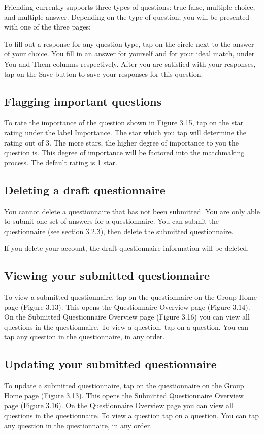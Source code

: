 \documentclass[a4paper,11pt,titlepage]{scrartcl}
\newcommand{\textapp}[1]{{\fontfamily{cmss}\selectfont#1}}
\newcommand{\Friending}{\textapp{Friending}}
\begin{document}
\Friending{} currently supports three types of questions: true-false, multiple choice, and multiple answer.  Depending on the type of question, you will be presented with one of the three pages:

To fill out a response for any question type, tap on the circle next to the answer of your choice.
You fill in an answer for yourself and for your ideal match, under You and Them columns respectively.  After you are satisfied with your responses, tap on the Save button to save your responses for this question.

\subsection{Flagging important questions}
\label{sec:questionnaire-importance}
To rate the importance of the question shown in Figure 3.15, tap on the star rating  under the label Importance.  The star which you tap will determine the rating out of 3.  The more stars, the higher degree of  importance to you the question is.  This degree of importance will be factored into the matchmaking process.  The default rating is 1 star. 

\subsection{Deleting a draft questionnaire}
\label{sec:questionnaire-delete}
You cannot delete a questionnaire that has not been submitted.   You are only able to submit one set of answers for a questionnaire.  You can submit the questionnaire (see section 3.2.3), then delete the submitted questionnaire.

If you delete your account, the draft questionnaire information will be deleted.

\subsection{Viewing your submitted questionnaire}
\label{sec:questionnaire-submitted-view}
To view a submitted questionnaire, tap on the questionnaire on the Group Home page (Figure 3.13). This opens the Questionnaire Overview page (Figure 3.14).   On the Submitted Questionnaire Overview page (Figure 3.16) you can view all questions in the questionnaire.  To view a question, tap on a question.  You can tap any question in the questionnaire, in any order.  

\subsection{Updating your submitted questionnaire}
\label{sec:questionnaire-submitted-update}
To update a submitted questionnaire, tap on the questionnaire on the Group Home page (Figure 3.13). This opens the Submitted Questionnaire Overview page (Figure 3.16).  On the Questionnaire Overview page you can view all questions in the questionnaire.  To view a question tap on a question.  You can tap any question in the questionnaire, in any order.  
\end{document}
